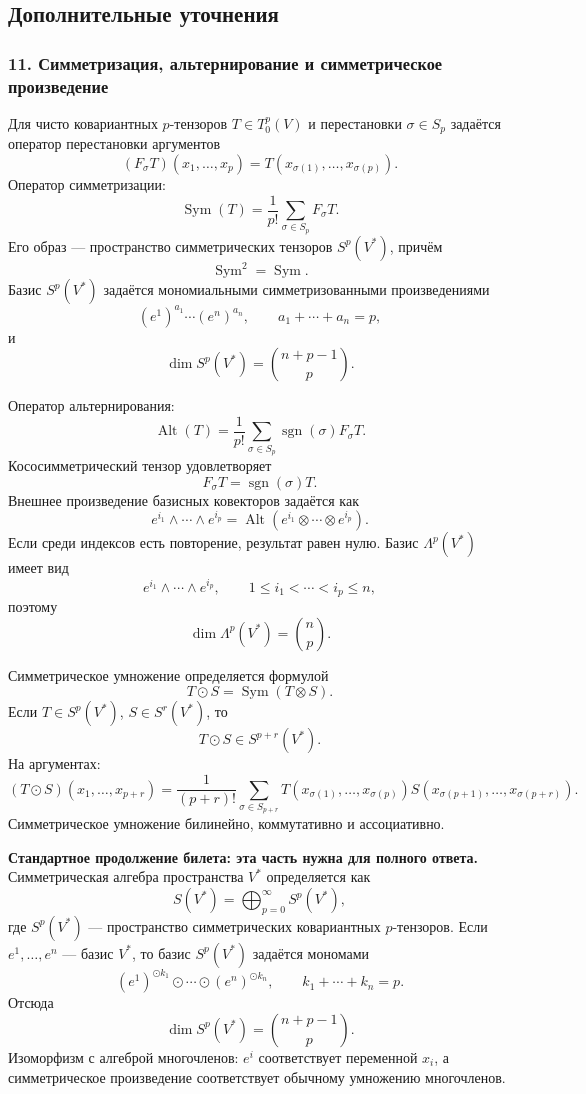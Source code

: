\documentclass[12pt,a4paper]{article}
\theoremstyle{definition}
\theoremstyle{plain}
\theoremstyle{remark}
\newenvironment{planadd}{\begin{planbox}}{\end{planbox}}
\newcommand{\Sym}{\operatorname{Sym}}
\newcommand{\Alt}{\operatorname{Alt}}
\providecommand{\sgn}{\operatorname{sgn}}
\begin{document}
\subsection*{Дополнительные уточнения}

\subsubsection*{11. Симметризация, альтернирование и симметрическое произведение}
Для чисто ковариантных $p$-тензоров $T\in T^p_0(V)$ и перестановки $\sigma\in S_p$ задаётся оператор перестановки аргументов
\[
    (F_\sigma T)(x_1,\ldots,x_p)=T(x_{\sigma(1)},\ldots,x_{\sigma(p)}).
\]
Оператор симметризации:
\[
    \Sym(T)=\frac1{p!}\sum_{\sigma\in S_p}F_\sigma T.
\]
Его образ --- пространство симметрических тензоров $S^p(V^*)$, причём
\[
    \Sym^2=\Sym.
\]
Базис $S^p(V^*)$ задаётся мономиальными симметризованными произведениями
\[
    (e^1)^{a_1}\cdots (e^n)^{a_n},
    \qquad
    a_1+\cdots+a_n=p,
\]
и
\[
    \dim S^p(V^*)=\binom{n+p-1}{p}.
\]

Оператор альтернирования:
\[
    \Alt(T)=\frac1{p!}\sum_{\sigma\in S_p}\sgn(\sigma)F_\sigma T.
\]
Кососимметрический тензор удовлетворяет
\[
    F_\sigma T=\sgn(\sigma)T.
\]
Внешнее произведение базисных ковекторов задаётся как
\[
    e^{i_1}\wedge\cdots\wedge e^{i_p}
    =\Alt(e^{i_1}\otimes\cdots\otimes e^{i_p}).
\]
Если среди индексов есть повторение, результат равен нулю. Базис $\Lambda^p(V^*)$ имеет вид
\[
    e^{i_1}\wedge\cdots\wedge e^{i_p},
    \qquad
    1\le i_1<\cdots<i_p\le n,
\]
поэтому
\[
    \dim\Lambda^p(V^*)=\binom np.
\]

Симметрическое умножение определяется формулой
\[
    T\odot S=\Sym(T\otimes S).
\]
Если $T\in S^p(V^*)$, $S\in S^r(V^*)$, то
\[
    T\odot S\in S^{p+r}(V^*).
\]
На аргументах:
\[
    (T\odot S)(x_1,\ldots,x_{p+r})
    =\frac1{(p+r)!}\sum_{\sigma\in S_{p+r}}
    T(x_{\sigma(1)},\ldots,x_{\sigma(p)})
    S(x_{\sigma(p+1)},\ldots,x_{\sigma(p+r)}).
\]
Симметрическое умножение билинейно, коммутативно и ассоциативно.
\begin{planadd}
\textbf{Стандартное продолжение билета: эта часть нужна для полного ответа.}
Симметрическая алгебра пространства $V^*$ определяется как
\[
    S(V^*)=\bigoplus_{p=0}^{\infty} S^p(V^*),
\]
где $S^p(V^*)$ — пространство симметрических ковариантных $p$-тензоров.
Если $e^1,\ldots,e^n$ — базис $V^*$, то базис $S^p(V^*)$ задаётся мономами
\[
    (e^1)^{\odot k_1}\odot\cdots\odot(e^n)^{\odot k_n},
    \qquad k_1+\cdots+k_n=p.
\]
Отсюда
\[
    \dim S^p(V^*)=\binom{n+p-1}{p}.
\]
Изоморфизм с алгеброй многочленов: $e^i$ соответствует переменной $x_i$, а
симметрическое произведение соответствует обычному умножению многочленов.
\end{planadd}
\end{document}
